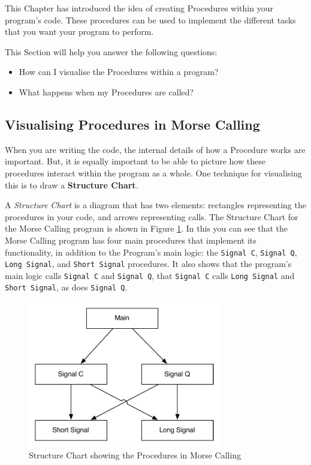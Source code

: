 This Chapter has introduced the idea of creating Procedures within your program's code. These procedures can be used to implement the different tasks that you want your program to perform. 

This Section will help you answer the following questions:
\begin{itemize}
  \item How can I visualise the Procedures within a program?
  \item What happens when my Procedures are called?
\end{itemize}

\subsection{Visualising Procedures in Morse Calling} %
\label{sub:visualising_morse_calling}

When you are writing the code, the internal details of how a Procedure works are important. But, it is equally important to be able to picture how these procedures interact within the program as a whole. One technique for visualising this is to draw a \textbf{Structure Chart}.

A \emph{Structure Chart} is a diagram that has two elements: rectangles representing the procedures in your code, and arrows representing calls. The Structure Chart for the Morse Calling program is shown in Figure \ref{fig:procedure-decl-morsecalling-structure}. In this you can see that the Morse Calling program has four main procedures that implement its functionality, in addition to the Program's main logic: the \texttt{Signal C}, \texttt{Signal Q}, \texttt{Long Signal}, and \texttt{Short Signal} procedures. It also shows that the program's main logic calls \texttt{Signal C} and \texttt{Signal Q}, that \texttt{Signal C} calls \texttt{Long Signal} and \texttt{Short Signal}, as does \texttt{Signal Q}.

\begin{figure}[htbp]
   \centering
   \includegraphics[width=0.75\textwidth]{./topics/procedure-decl/diagrams/MorseCallingStructureChart} 
   \caption{Structure Chart showing the Procedures in Morse Calling}
   \label{fig:procedure-decl-morsecalling-structure}
\end{figure}

